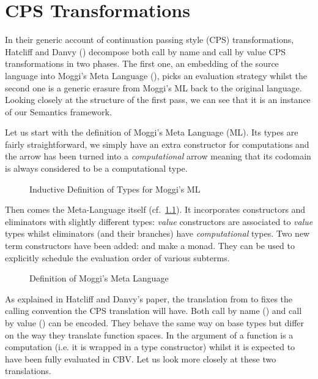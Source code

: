 \chapter{CPS Transformations}
\label{cps-transformation}

In their generic account of continuation passing style (CPS) transformations,
Hatcliff and Danvy (\citeyear{hatcliff1994generic}) decompose both call by name
and call by value CPS transformations in two phases. The first one, an
embedding of the source language into Moggi's Meta Language
(\citeyear{moggi1991notions}),
picks an evaluation strategy whilst the second one is a generic erasure
from Moggi's ML back to the original language. Looking closely at the
structure of the first pass, we can see that it is an instance of our
Semantics framework.

Let us start with the definition of Moggi's Meta Language (ML). Its types
are fairly straightforward, we simply have an extra constructor \AIC{\#\_}
for computations and the arrow has been turned into a \emph{computational}
arrow meaning that its codomain is always considered to be a computational type.

\begin{figure}[h]
\caption{Inductive Definition of Types for Moggi's ML}
\end{figure}

Then comes the Meta-Language itself (cf.~\cref{fig:moggiml}). It incorporates
 constructors and eliminators with slightly different types: \emph{value}
constructors are associated to \emph{value} types whilst eliminators (and their
branches) have \emph{computational} types. Two new term constructors have been
added:  and  make \AIC{\#\_} a monad. They can be used to
explicitly schedule the evaluation order of various subterms.

\begin{figure}[h]
\caption{Definition of Moggi's Meta Language\label{fig:moggiml}}
\end{figure}

As explained in Hatcliff and Danvy's paper, the translation from  to
 fixes the calling convention the CPS translation will have. Both call
by name () and call by value () can be encoded. They behave the
same way on base types but differ on the way they translate function spaces.
In  the argument of a function is a computation (i.e. it is wrapped in
a \AIC{\#\_} type constructor) whilst it is expected to have been fully evaluated
in CBV. Let us look more closely at these two translations.

